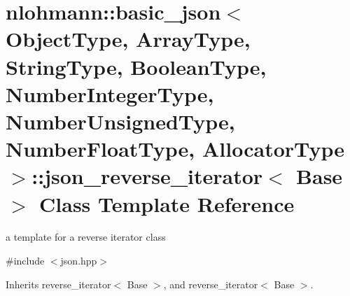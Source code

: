 \hypertarget{classnlohmann_1_1basic__json_1_1json__reverse__iterator}{\section{nlohmann\-:\-:basic\-\_\-json$<$ Object\-Type, Array\-Type, String\-Type, Boolean\-Type, Number\-Integer\-Type, Number\-Unsigned\-Type, Number\-Float\-Type, Allocator\-Type $>$\-:\-:json\-\_\-reverse\-\_\-iterator$<$ Base $>$ Class Template Reference}
\label{classnlohmann_1_1basic__json_1_1json__reverse__iterator}
}


a template for a reverse iterator class  




{\ttfamily \#include $<$json.\-hpp$>$}



Inherits reverse\-\_\-iterator$<$ Base $>$, and reverse\-\_\-iterator$<$ Base $>$.

